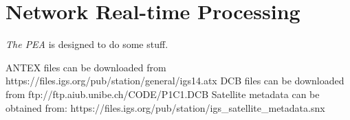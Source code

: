 \section{Network Real-time Processing}

\textit{The PEA} is designed to do some stuff.

ANTEX files can be downloaded from https://files.igs.org/pub/station/general/igs14.atx
DCB files can be downloaded from ftp://ftp.aiub.unibe.ch/CODE/P1C1.DCB
Satellite metadata can be obtained from: https://files.igs.org/pub/station/igs\_satellite\_metadata.snx